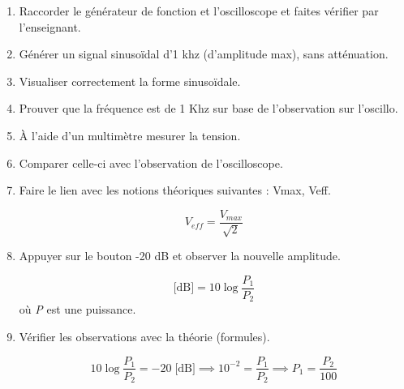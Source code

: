 \documentclass[a4paper]{article}
\begin{document}
\begin{enumerate}
    \item Raccorder le générateur de fonction et l’oscilloscope et faites vérifier par l'enseignant.
    \item Générer un signal sinusoïdal d'1 khz (d'amplitude max), sans atténuation.
    \item Visualiser correctement la forme sinusoïdale.
    \item Prouver que la fréquence est de 1 Khz sur base de l'observation sur l'oscillo.
    \item À l'aide d'un multimètre mesurer la tension.
    \item Comparer celle-ci avec l'observation de l'oscilloscope.
    \item Faire le lien avec les notions théoriques suivantes : Vmax, Veff.
    \begin{example}
        \[ V_{eff} = \frac{V_{max}}{\sqrt{2}} \]
    \end{example}
    \item Appuyer sur le bouton -20 dB et observer la nouvelle amplitude.
    \begin{example}
        \[ \text{[dB]} = 10 \log \frac{P_1}{P_2} \]
        où \textit{P} est une puissance.
    \end{example}
    \item Vérifier les observations avec la théorie (formules).
    \begin{example}
        \[
            10 \log \frac{P_1}{P_2} = -20 \; \text{[dB]}
            \implies 10^{-2} = \frac{P_1}{P_2}
            \implies P_1 = \frac{P_2}{100}
        \]


\end{example}
\end{enumerate}
\end{document}
